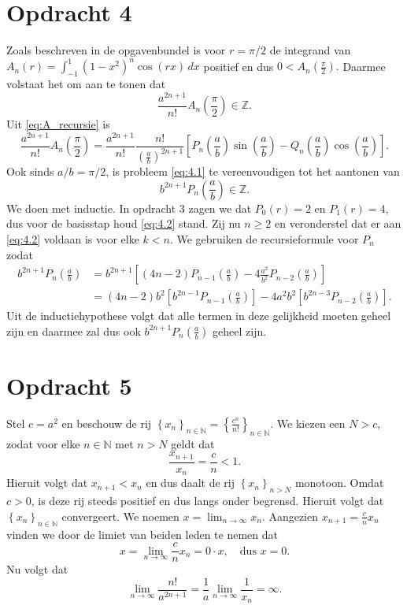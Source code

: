 \documentclass[12pt,a4paper]{article}
\theoremstyle{definition}
\numberwithin{equation}{section}
\begin{document}
\section*{Opdracht 4}
Zoals beschreven in de opgavenbundel is voor $r=\pi/2$ de integrand van $A_n(r) = \int_{-1}^{1}\left(1-x^2\right)^n\cos\left(rx\right)\,dx$ positief en dus $0<A_n\left(\frac{\pi}{2}\right).$ 
Daarmee volstaat het om aan te tonen dat 
\begin{equation}
    \frac{a^{2n+1}}{n!}A_n\left(\frac{\pi}{2}\right)\in\mathbb{Z}.\label{eq:4.1}
\end{equation} 
Uit \ref{eq:A_recursie} is 
$$    \frac{a^{2n+1}}{n!}A_n\left(\frac{\pi}{2}\right) =\frac{a^{2n+1}}{n!}\frac{n!}{\left(\frac{a}{b}\right)^{2n+1}}\left[P_n\left(\frac{a}{b}\right)\sin{\left(\frac{a}{b}\right)}-Q_n\left(\frac{a}{b}\right)\cos{\left(\frac{a}{b}\right)}\right].$$
    Ook sinds $a/b = \pi/2$, is probleem \eqref{eq:4.1} te vereenvoudigen tot het aantonen van
   \begin{equation}
       b^{2n+1}P_n\left(\frac{a}{b}\right)\in\mathbb{Z}. \label{eq:4.2}
   \end{equation}
We doen met inductie. In opdracht 3 zagen we dat $P_0(r) = 2$ en $P_1(r) =4$, dus voor de basisstap houd \eqref{eq:4.2} stand. Zij nu $n\geq 2$ en veronderstel dat er aan \eqref{eq:4.2} voldaan is voor elke $k<n$. We gebruiken de recursieformule voor $P_n$ zodat
\begin{align*}
     b^{2n+1}P_n\left(\frac{a}{b}\right)&=b^{2n+1}\left[\left(4n-2\right)P_{n-1}\left(\frac{a}{b}\right)-4\frac{a^2}{b^2}P_{n-2}\left(\frac{a}{b}\right)\right]\\
               &=\left(4n-2\right)b^2\left[b^{2n-1}P_{n-1}\left(\frac{a}{b}\right)\right] - 4a^2b^2\left[b^{2n-3}P_{n-2}\left(\frac{a}{b}\right)\right].
\end{align*}
Uit de inductiehypothese volgt dat alle termen in deze gelijkheid moeten geheel zijn en daarmee zal dus ook $b^{2n+1}P_n\left(\frac{a}{b}\right)$ geheel zijn.


\section*{Opdracht 5}
Stel $c=a^2$ en beschouw de rij $\left\{x_n\right\}_{n\in\mathbb{N}}=\left\{\frac{c^{n}}{n!}\right\}_{n\in\mathbb{N}}$. We kiezen een $N>c$, zodat voor elke $n\in\mathbb{N}$ met $n>N$ geldt dat
$$\frac{x_{n+1}}{x_n}=\frac{c}{n}<1.$$ Hieruit volgt dat $x_{n+1}<x_n$ en dus daalt de rij $\left\{x_n\right\}_{n>N}$ monotoon. Omdat $c>0$, is deze rij steeds positief en dus langs onder begrensd. Hieruit volgt dat $\left\{x_n\right\}_{n\in\mathbb{N}}$ convergeert. 
We noemen $x=\lim_{n\to\infty}x_n$. Aangezien $x_{n+1}=\frac{c}{n}x_n$ vinden we door de limiet van beiden leden te nemen dat 
$$ x = \lim_{n\to\infty} \frac{c}{n} x_n= 0\cdot x, \quad \text{dus } x=0.$$
Nu volgt dat
$$\lim_{n\to\infty}\frac{n!}{a^{2n+1}}=\frac{1}{a}\lim_{n\to\infty}\frac{1}{x_n}=\infty.$$
\end{document}
